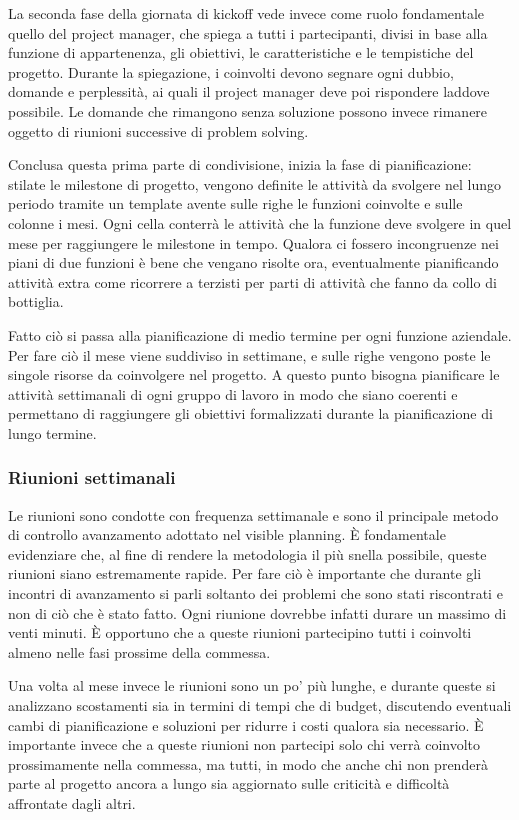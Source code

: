 \begin{multicols}{2}
	La seconda fase della giornata di kickoff vede invece come ruolo fondamentale quello del project manager, che spiega a tutti i partecipanti, divisi in base alla funzione di appartenenza, gli obiettivi, le caratteristiche e le tempistiche del progetto. Durante la spiegazione, i coinvolti devono segnare ogni dubbio, domande e perplessità, ai quali il project manager deve poi rispondere laddove possibile. Le domande che rimangono senza soluzione possono invece rimanere oggetto di riunioni successive di problem solving.

	Conclusa questa prima parte di condivisione, inizia la fase di pianificazione: stilate le milestone di progetto, vengono definite le attività da svolgere nel lungo periodo tramite un template avente sulle righe le funzioni coinvolte e sulle colonne i mesi. Ogni cella conterrà le attività che la funzione deve svolgere in quel mese per raggiungere le milestone in tempo. Qualora ci fossero incongruenze nei piani di due funzioni è bene che vengano risolte ora, eventualmente pianificando attività extra come ricorrere a terzisti per parti di attività che fanno da collo di bottiglia.

	Fatto ciò si passa alla pianificazione di medio termine per ogni funzione aziendale. Per fare ciò il mese viene suddiviso in settimane, e sulle righe vengono poste le singole risorse da coinvolgere nel progetto. A questo punto bisogna pianificare le attività settimanali di ogni gruppo di lavoro in modo che siano coerenti e permettano di raggiungere gli obiettivi formalizzati durante la pianificazione di lungo termine.

	\subsubsection{Riunioni settimanali}
	Le riunioni sono condotte con frequenza settimanale e sono il principale metodo di controllo avanzamento adottato nel visible planning. È fondamentale evidenziare che, al fine di rendere la metodologia il più snella possibile, queste riunioni siano estremamente rapide. Per fare ciò è importante che durante gli incontri di avanzamento si parli soltanto dei problemi che sono stati riscontrati e non di ciò che è stato fatto. Ogni riunione dovrebbe infatti durare un massimo di venti minuti. È opportuno che a queste riunioni partecipino tutti i coinvolti almeno nelle fasi prossime della commessa.

	Una volta al mese invece le riunioni sono un po’ più lunghe, e durante queste si analizzano scostamenti sia in termini di tempi che di budget, discutendo eventuali cambi di pianificazione e soluzioni per ridurre i costi qualora sia necessario. È importante invece che a queste riunioni non partecipi solo chi verrà coinvolto prossimamente nella commessa, ma tutti, in modo che anche chi non prenderà parte al progetto ancora a lungo sia aggiornato sulle criticità e difficoltà affrontate dagli altri.


\end{multicols}
